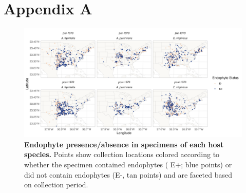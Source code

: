 \documentclass[11pt]{article}
\begin{document}
	\section*{Appendix A}
	\renewcommand{\thefigure}{A\arabic{figure}}
	\setcounter{figure}{0}
	
		\renewcommand{\thetable}{A\arabic{table}}
	\setcounter{equation}{0}  %
	\setcounter{figure}{0}
	\setcounter{table}{0}
	
	\begin{figure}[H]
		\centering
		\includegraphics[width = \linewidth]{../Plots/endo_status_map.png}
		\caption{\textbf{Endophyte presence/absence in specimens of each host species.} Points show collection locations colored according to whether the specimen contained endophytes ( E+; blue points) or did not contain endophytes (E-, tan points) and are faceted based on collection period.}
		\label{fig:endo_status_map}
	\end{figure}
	
\end{document}
